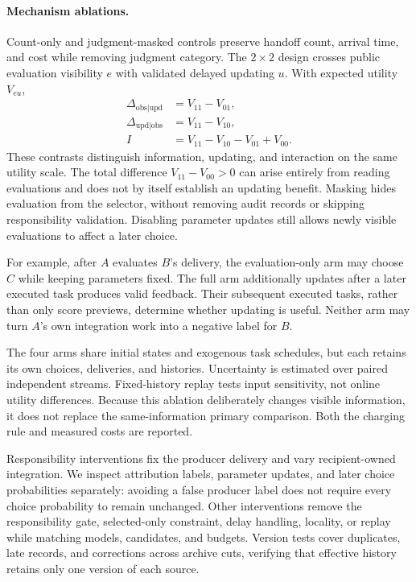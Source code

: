 \documentclass[sigconf,anonymous]{aamas}
\begin{document}
\paragraph{Mechanism ablations.} Count-only and judgment-masked controls preserve handoff count, arrival time, and cost while removing judgment category. The $2\times2$ design crosses public evaluation visibility $e$ with validated delayed updating $u$. With expected utility $V_{eu}$,
\begin{equation}
\begin{aligned}
 \Delta_{\mathrm{obs}|\mathrm{upd}}&=V_{11}-V_{01},\\
 \Delta_{\mathrm{upd}|\mathrm{obs}}&=V_{11}-V_{10},\\
 I&=V_{11}-V_{10}-V_{01}+V_{00}.
\end{aligned}
\label{eq:factorial}
\end{equation}
These contrasts distinguish information, updating, and interaction on the same utility scale. The total difference $V_{11}-V_{00}>0$ can arise entirely from reading evaluations and does not by itself establish an updating benefit. Masking hides evaluation from the selector, without removing audit records or skipping responsibility validation. Disabling parameter updates still allows newly visible evaluations to affect a later choice.

For example, after $A$ evaluates $B$'s delivery, the evaluation-only arm may choose $C$ while keeping parameters fixed. The full arm additionally updates after a later executed task produces valid feedback. Their subsequent executed tasks, rather than only score previews, determine whether updating is useful. Neither arm may turn $A$'s own integration work into a negative label for $B$.

The four arms share initial states and exogenous task schedules, but each retains its own choices, deliveries, and histories. Uncertainty is estimated over paired independent streams. Fixed-history replay tests input sensitivity, not online utility differences. Because this ablation deliberately changes visible information, it does not replace the same-information primary comparison. Both the charging rule and measured costs are reported.

Responsibility interventions fix the producer delivery and vary recipient-owned integration. We inspect attribution labels, parameter updates, and later choice probabilities separately: avoiding a false producer label does not require every choice probability to remain unchanged. Other interventions remove the responsibility gate, selected-only constraint, delay handling, locality, or replay while matching models, candidates, and budgets. Version tests cover duplicates, late records, and corrections across archive cuts, verifying that effective history retains only one version of each source.
\end{document}
